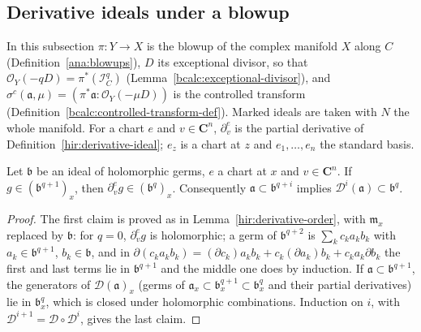 \subsection{Derivative ideals under a blowup}

In this subsection \(\pi\colon Y\to X\) is the blowup of the complex manifold \(X\) along \(C\)
(Definition~\ref{ana:blowups}), \(D\) its exceptional divisor, so that \(\mathcal O_Y(-qD)=\pi^*(\mathcal I_C^q)\)
(Lemma~\ref{bcalc:exceptional-divisor}), and \(\sigma^c(\mathfrak a,\mu)=(\pi^*\mathfrak a:\mathcal O_Y(-\mu D))\) is the
controlled transform (Definition~\ref{bcalc:controlled-transform-def}). Marked ideals are taken with \(N\) the whole
manifold. For a chart \(e\) and \(v\in\mathbf C^n\), \(\partial^e_v\) is the partial derivative of
Definition~\ref{hir:derivative-ideal}; \(e_z\) is a chart at \(z\) and \(e_1,\dots,e_n\) the standard basis.

\begin{lemma}
\label{mc:derivative-power}
\leanok
Let \(\mathfrak b\) be an ideal of holomorphic germs, \(e\) a chart at \(x\) and \(v\in\mathbf C^n\). If \(g\in(\mathfrak b^{q+1})_x\), then
\(\partial^e_vg\in(\mathfrak b^q)_x\). Consequently \(\mathfrak a\subset\mathfrak b^{q+i}\) implies \(\mathcal D^i(\mathfrak a)\subset\mathfrak b^q\).
\end{lemma}
\begin{proof}
\leanok
The first claim is proved as in Lemma~\ref{hir:derivative-order}, with \(\mathfrak m_x\) replaced by \(\mathfrak b\): for \(q=0\),
\(\partial^e_vg\) is holomorphic; a germ of \(\mathfrak b^{q+2}\) is \(\sum_kc_ka_kb_k\) with \(a_k\in\mathfrak b^{q+1}\), \(b_k\in\mathfrak b\), and in
\(\partial(c_ka_kb_k)=(\partial c_k)a_kb_k+c_k(\partial a_k)b_k+c_ka_k\partial b_k\) the first and last terms lie in \(\mathfrak b^{q+1}\) and the
middle one does by induction. If \(\mathfrak a\subset\mathfrak b^{q+1}\), the generators of \(\mathcal D(\mathfrak a)_x\) (germs of
\(\mathfrak a_x\subset\mathfrak b^{q+1}_x\subset\mathfrak b^q_x\) and their partial derivatives) lie in \(\mathfrak b^q_x\), which is closed
under holomorphic combinations. Induction on \(i\), with \(\mathcal D^{i+1}=\mathcal D\circ\mathcal D^i\), gives the last claim.
\end{proof}


